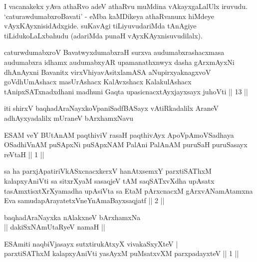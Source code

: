 \begin{artha}
I vacanakekx yAva athaRvo adeV athaRvu muMdina vAkayxgaLalUlx iruvudu. 
`caturawdumabxroBavati' - eMba kaMDikeya athaRvanunx hiMdeye 
vAyxKAyxnisidAdxgide. suKavAgi tiLiyuvudariMda tAnAgiye 
tiLidukoLaLxbahudu (adariMda punaH vAyxKAyxnisuvudilalx).
\end{artha}


\begin{shl}
\footnotemark[3]caturwdumabxroV BavatwyxdumabxraH surxva audumabxrashacxmasa audumabxra idhamx audumabxyAR upamanathxnwyx dasha gArxmAyxNi dhAnAyxni Bavanitx virxVhiyavAsitxlamASA aNupirxyaknagxvoV goVdhUmAshacx masUrAshacx KalAvxshacx KalakulAshacx tAnipxSATxnadxdhani madhuni Gaqta upasicnacxtAyxjayxsayx juhoVti || 13 ||
\end{shl}

\begin{center}
iti shirxV baqhadAraNayxkoVpaniSadfBASayx vAtiRkadalilx AraneV 
adhAyxyadalilx mUraneV bArxhamxNavu
\end{center}


\begin{shl}
ESAM veY BUtAnAM paqthiviV rasaH paqthivAyx ApoV\s pAmoVSadhaya OSadhiVnAM puSApxNi puSApxNAM PalAni PalAnAM puruSaH puruSasayx reVtaH || 1 ||
\end{shl}

\begin{shl}
sa ha parxjApatiriVkASxcnacxkerxV hanAtxsemxY parxtiSAThxM kalapxyAniVti sa sitxrXyaM sasaqjeV tAM saqSATxvXdha upAsatx tasAmxtisxtXrXyamadha upAsiVta sa EtaM pArxcnacxM gArxvANamAtamxna Eva samudapArayatetxVneYnAmaBayxsaqjatf || 2 ||
\end{shl}

\begin{center}
baqhadAraNayxka nAlakxneV bArxhamxNa\\
|| dakiSxNAmUtaRyeV namaH ||
\end{center}

\begin{shl}
ESAmiti naqbiVjasayx sutxtirukAtxyX vivakaSxyXteV | \\
parxtiSAThxM kalapxyAniVti yasAyxM puMsatxvXM parxpadayxteV \hfill|| 1 || 
\end{shl}

